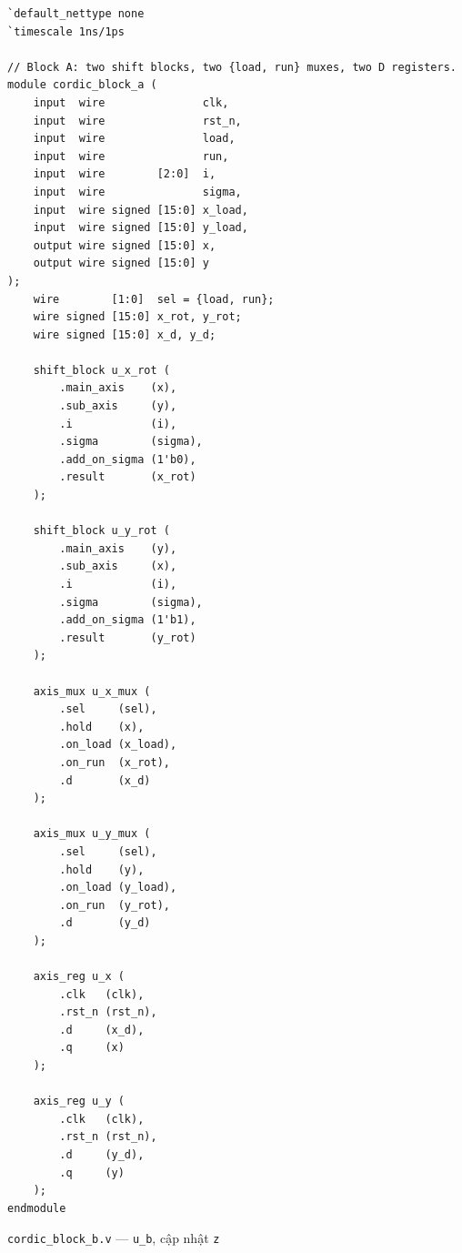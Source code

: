 \documentclass[12pt,a4paper]{article}
\begin{document}
\begin{verbatim}
`default_nettype none
`timescale 1ns/1ps

// Block A: two shift blocks, two {load, run} muxes, two D registers.
module cordic_block_a (
    input  wire               clk,
    input  wire               rst_n,
    input  wire               load,
    input  wire               run,
    input  wire        [2:0]  i,
    input  wire               sigma,
    input  wire signed [15:0] x_load,
    input  wire signed [15:0] y_load,
    output wire signed [15:0] x,
    output wire signed [15:0] y
);
    wire        [1:0]  sel = {load, run};
    wire signed [15:0] x_rot, y_rot;
    wire signed [15:0] x_d, y_d;

    shift_block u_x_rot (
        .main_axis    (x),
        .sub_axis     (y),
        .i            (i),
        .sigma        (sigma),
        .add_on_sigma (1'b0),
        .result       (x_rot)
    );

    shift_block u_y_rot (
        .main_axis    (y),
        .sub_axis     (x),
        .i            (i),
        .sigma        (sigma),
        .add_on_sigma (1'b1),
        .result       (y_rot)
    );

    axis_mux u_x_mux (
        .sel     (sel),
        .hold    (x),
        .on_load (x_load),
        .on_run  (x_rot),
        .d       (x_d)
    );

    axis_mux u_y_mux (
        .sel     (sel),
        .hold    (y),
        .on_load (y_load),
        .on_run  (y_rot),
        .d       (y_d)
    );

    axis_reg u_x (
        .clk   (clk),
        .rst_n (rst_n),
        .d     (x_d),
        .q     (x)
    );

    axis_reg u_y (
        .clk   (clk),
        .rst_n (rst_n),
        .d     (y_d),
        .q     (y)
    );
endmodule
\end{verbatim}

\noindent\texttt{cordic\_block\_b.v} — \texttt{u\_b}, cập nhật \texttt{z}
\end{document}
